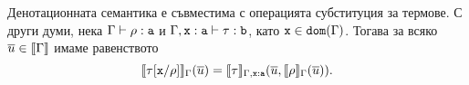 \begin{framed}
\begin{lemma}\label{lem:pcf:substitution}
  Денотационната семантика е съвместима с операцията субституция за термове.
  С други думи, нека $\Gamma \vdash \rho : \texttt{a}$ и $\Gamma, \texttt{x}:\texttt{a} \vdash \tau : \texttt{b}$,
като $\texttt{x} \in \texttt{dom}(\Gamma)$. Тогава 
    за всяко $\overline{u} \in \llbracket{\Gamma}\rrbracket$ имаме равенството
    \[\llbracket{\tau[\texttt{x}/{\rho}]}\rrbracket_\Gamma(\overline{u}) = \llbracket{\tau}\rrbracket_{\Gamma,\texttt{x}:\texttt{a}}(\overline{u},\llbracket{\rho}\rrbracket_\Gamma(\overline{u})).\]
\end{lemma}
\end{framed}

